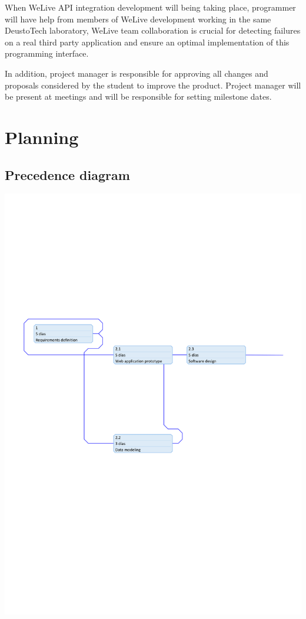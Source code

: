 \documentclass{DeustoFDP}
\begin{document}
When WeLive API integration development will being taking place, programmer will have help from members of WeLive development working in the same DeustoTech laboratory, WeLive team collaboration is crucial for detecting failures on a real third party application and ensure an optimal implementation of this programming interface.

In addition, project manager is responsible for approving all changes and proposals considered by the student to improve the product. Project manager will be present at meetings and will be responsible for setting milestone dates.

\chapter{Planning}\label{cha:planning}
\section{Precedence diagram}
\begin{center}
\includegraphics[width=1\linewidth]{fig/precedence-1}
\end{center}
\end{document}
